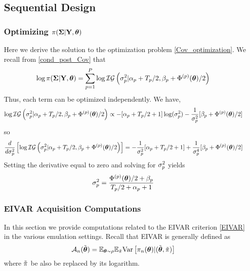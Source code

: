 \documentclass[12pt]{article}
\begin{document}
\subsection{Sequential Design}
\subsubsection{Optimizing $\pi(\boldsymbol{\Sigma}|\mathbf{Y}, \boldsymbol{\theta})$}
Here we derive the solution to the optimization problem \ref{Cov_optimization}. We recall from \ref{cond_post_Cov} that 
\begin{align*}
\log \pi(\boldsymbol{\Sigma}|\mathbf{Y}, \boldsymbol{\theta}) &= \sum_{p = 1}^{P} \log \mathcal{IG}\left(\sigma_{p}^2|\alpha_{p} + T_{p}/2, \beta_{p} + \Phi^{(p)}(\boldsymbol{\theta})/2 \right)
\end{align*}
Thus, each term can be optimized independently. We have, 
\begin{align*}
\log \mathcal{IG}\left(\sigma_{p}^2|\alpha_{p} + T_{p}/2, \beta_{p} + \Phi^{(p)}(\boldsymbol{\theta})/2 \right) &\propto -[\alpha_{p} + T_{p}/2 + 1]\log(\sigma^2_{p})
																									       - \frac{1}{\sigma^2_{p}} [\beta_{p} + \Phi^{(p)}(\boldsymbol{\theta})/2]
\end{align*}
so 
\begin{align*}
\frac{d}{d\sigma_{p}^2}\left[\log \mathcal{IG}\left(\sigma_{p}^2|\alpha_{p} + T_{p}/2, \beta_{p} + \Phi^{(p)}(\boldsymbol{\theta})/2 \right)\right] &= -\frac{1}{\sigma_{p}^2}[\alpha_{p} + T_{p}/2 + 1] + \frac{1}{\sigma_{p}^4} [\beta_{p} + \Phi^{(p)}(\boldsymbol{\theta})/2]
\end{align*}
Setting the derivative equal to zero and solving for $\sigma^2_{p}$ yields
\begin{align*}
\sigma_{p}^2 &= \frac{\Phi^{(p)}(\boldsymbol{\theta})/2 + \beta_{p}}{T_{p}/2 + \alpha_{p} + 1}
\end{align*}


\subsubsection{EIVAR Acquisition Computations}
In this section we provide computations related to the EIVAR criterion \ref{EIVAR} in the various emulation settings. Recall that EIVAR is generally defined as 
\begin{align*}
\mathcal{A}_{n}(\tilde{\boldsymbol{\theta}}) &= \mathbb{E}_{\boldsymbol{\theta} \sim \rho} \mathbb{E}_{\tilde{\pi}} \mathrm{Var}\left[\pi_{n}(\boldsymbol{\theta}) | (\tilde{\boldsymbol{\theta}}, \tilde{\pi}) \right] 
\end{align*}
where $\tilde{\pi}$ be also be replaced by its logarithm. 
\end{document}
